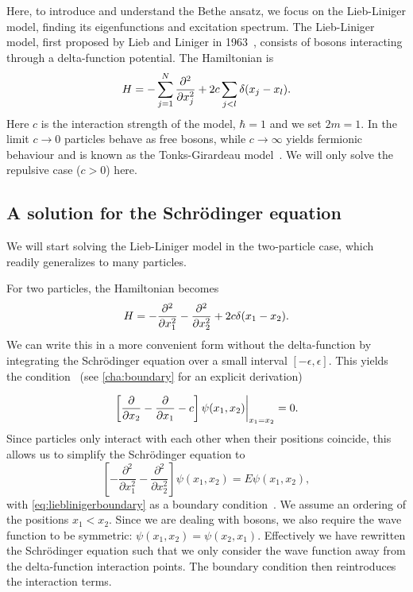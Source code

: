 \documentclass[11pt, a4paper]{report} %
\begin{document}
Here, to introduce and understand the Bethe ansatz, we focus on the Lieb-Liniger model, finding its eigenfunctions and excitation spectrum.
The Lieb-Liniger model, first proposed by Lieb and Liniger in 1963~\cite{Lieb1963, Lieb1963a}, consists of bosons interacting through a delta-function potential.
The Hamiltonian is
\begin{equation}
	H = - \sum_{j=1}^{N} \frac{\partial^2}{\partial x_j^2} + 2c \sum_{j<l} \delta\qty(x_j - x_l).
\end{equation}
Here \(c\) is the interaction strength of the model, \(\hbar=1\) and we set \(2m=1\).
In the limit \(c\to0\) particles behave as free bosons, while \(c\to\infty\) yields fermionic behaviour and is known as the Tonks-Girardeau model~\cite{Lieb1963, Franchini2017}.
We will only solve the repulsive case (\(c > 0\)) here.

\subsection{A solution for the Schrödinger equation}

We will start solving the Lieb-Liniger model in the two-particle case, which readily generalizes to many particles.

For two particles, the Hamiltonian becomes
\begin{equation}
	H =  - \frac{\partial^2}{\partial x_1^2} - \frac{\partial^2}{\partial x_2^2} + 2c \delta\qty(x_1 - x_2).
\end{equation}
We can write this in a more convenient form without the delta-function by integrating the Schrödinger equation over a small interval \([-\epsilon,\epsilon]\).
This yields the condition~\cite{Lieb1963} (see \cref{cha:boundary} for an explicit derivation)

\begin{equation}\label{eq:lieblinigerboundary}
	\eval{\left[\frac{\partial}{\partial x_2} - \frac{\partial}{\partial x_1} - c\right] \psi(x_1, x_2)}_{x_1 = x_2} = 0.
\end{equation}
Since particles only interact with each other when their positions coincide, this allows us to simplify the Schrödinger equation to
\begin{equation}\label{eq:lieblinigersimple}
	\left[- \frac{\partial^2}{\partial x_1^2} - \frac{\partial^2}{\partial x_2^2}\right] \psi(x_1, x_2) = E \psi(x_1,x_2),
\end{equation}
with \cref{eq:lieblinigerboundary} as a boundary condition~\cite{Lieb1963}.
We assume an ordering of the positions \(x_1 < x_2\).
Since we are dealing with bosons, we also require the wave function to be symmetric: \(\psi(x_1,x_2) = \psi(x_2,x_1)\).
Effectively we have rewritten the Schrödinger equation such that we only consider the wave function away from the delta-function interaction points.
The boundary condition then reintroduces the interaction terms.
\end{document}
